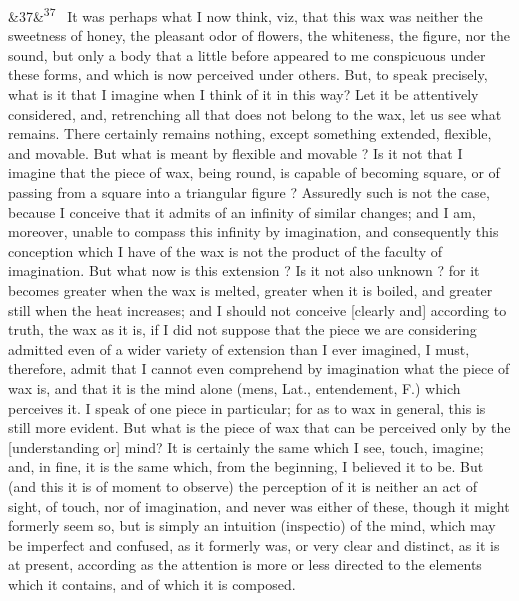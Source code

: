 \documentclass[12pt]{article}
\newcommand{\para}[1][]{\par\noindent\ifx&#1&\else\textsuperscript{\footnotesize #1}~\fi}
\begin{document}
\para[37] It was perhaps what I now think, viz, that this wax was neither the sweetness of honey, the pleasant odor of flowers, the whiteness, the figure, nor the sound, but only a body that a little before appeared to me conspicuous under these forms, and which is now perceived under others. But, to speak precisely, what is it that I imagine when I think of it in this way? Let it be attentively considered, and, retrenching all that does not belong to the wax, let us see what remains. There certainly remains nothing, except something extended, flexible, and movable. But what is meant by flexible and movable ? Is it not that I imagine that the piece of wax, being round, is capable of becoming square, or of passing from a square into a triangular figure ? Assuredly such is not the case, because I conceive that it admits of an infinity of similar changes; and I am, moreover, unable to compass this infinity by imagination, and consequently this conception which I have of the wax is not the product of the faculty of imagination. But what now is this extension ? Is it not also unknown ? for it becomes greater when the wax is melted, greater when it is boiled, and greater still when the heat increases; and I should not conceive [clearly and] according to truth, the wax as it is, if I did not suppose that the piece we are considering admitted even of a wider variety of extension than I ever imagined, I must, therefore, admit that I cannot even comprehend by imagination what the piece of wax is, and that it is the mind alone (mens, Lat., entendement, F.) which perceives it. I speak of one piece in particular; for as to wax in general, this is still more evident. But what is the piece of wax that can be perceived only by the [understanding or] mind? It is certainly the same which I see, touch, imagine; and, in fine, it is the same which, from the beginning, I believed it to be. But (and this it is of moment to observe) the perception of it is neither an act of sight, of touch, nor of imagination, and never was either of these, though it might formerly seem so, but is simply an intuition (inspectio) of the mind, which may be imperfect and confused, as it formerly was, or very clear and distinct, as it is at present, according as the attention is more or less directed to the elements which it contains, and of which it is composed.
\end{document}
